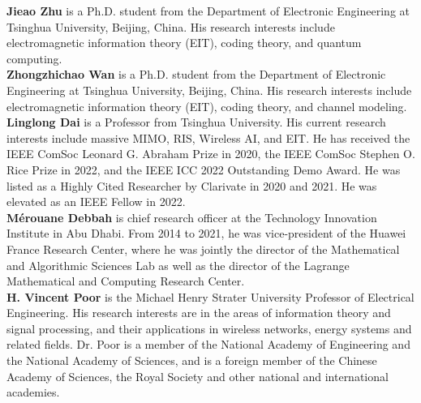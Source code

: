 \documentclass[journal,twocolumn]{IEEEtran}
\begin{document}
{\bf Jieao Zhu} is a Ph.D. student from the Department of Electronic Engineering at Tsinghua University, Beijing, China. His research interests include electromagnetic information theory (EIT), coding theory, and quantum computing. 
\\

{\bf Zhongzhichao Wan} is a Ph.D. student from the Department of Electronic Engineering at Tsinghua University, Beijing, China. His research interests include electromagnetic information theory (EIT), coding theory, and channel modeling. 
\\


{\bf Linglong Dai} is a Professor from Tsinghua University. His current research interests include massive MIMO, RIS, Wireless AI, and EIT. He has received the IEEE ComSoc Leonard G. Abraham Prize in 2020, the IEEE ComSoc Stephen O. Rice Prize in 2022, and the IEEE ICC 2022 Outstanding Demo Award. He was listed as a Highly Cited Researcher by Clarivate in 2020 and 2021. He was elevated as an IEEE Fellow in 2022.
\\

{\bf M\'{e}rouane Debbah} is chief research officer at the Technology Innovation Institute in Abu Dhabi. From 2014 to 2021, he was vice-president of the Huawei France Research Center, where he was jointly the director of the Mathematical and Algorithmic Sciences Lab as well as the director of the Lagrange Mathematical and Computing Research Center. 
\\

{\bf H. Vincent Poor} is the Michael Henry Strater University Professor of Electrical Engineering. His research interests are in the areas of information theory and signal processing, and their applications in wireless networks, energy systems and related fields. Dr. Poor is a member of the National Academy of Engineering and the National Academy of Sciences, and is a foreign member of the Chinese Academy of Sciences, the Royal Society and other national and international academies. 
\\
\end{document}
